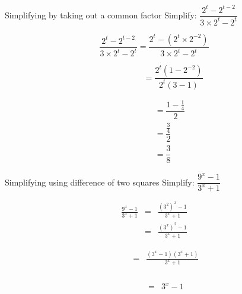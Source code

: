 \begin{wex}
{Simplifying by taking out a common factor}
{Simplify: $\dfrac{2^t-2^{t-2}}{3 \times 2^t - 2^t}$}
{%
\begin{equation*}
  \dfrac{2^t-2^{t-2}}{3 \times 2^t-2^t} =
  \dfrac{2^t-(2^t \times 2^{-2})}{3 \times 2^t - 2^t}
\end{equation*}

\begin{equation*}
  \phantom{\frac{2^t-2^{t-2}}{3 \times 2^t-2^t}} = \frac{2^t(1-2^{-2})}{2^t(3-1)}
\end{equation*}

\begin{align*}
  \phantom{\frac{2^t-2^{t-2}}{3.2^t-2^t}}
  &= \dfrac{1- \frac{1}{4}}{2} \\
  &= \dfrac{\frac{3}{4}}{2} \\
  &= \dfrac{3}{8} 
\end{align*}
} 
\end{wex}


\begin{wex}
{Simplifying using difference of two squares}
{Simplify: $\dfrac{9^x-1}{3^x+1}$}
{
\begin{eqnarray*}
 \frac{9^x-1}{3^x+1} & = & \frac{(3^2)^x -1}{3^x+1} \\
		     & = & \frac{(3^x)^2-1}{3^x+1} 
\end{eqnarray*}

\begin{eqnarray*}
 \phantom{\frac{9^x-1}{3^x+1}} & = & \frac{(3^x-1)(3^x+1)}{3^x+1}\\
\end{eqnarray*}

\begin{eqnarray*}
 \phantom{\frac{9^x-1}{3^x+1}} & = & 3^x-1\\
\end{eqnarray*}
}
\end{wex}


